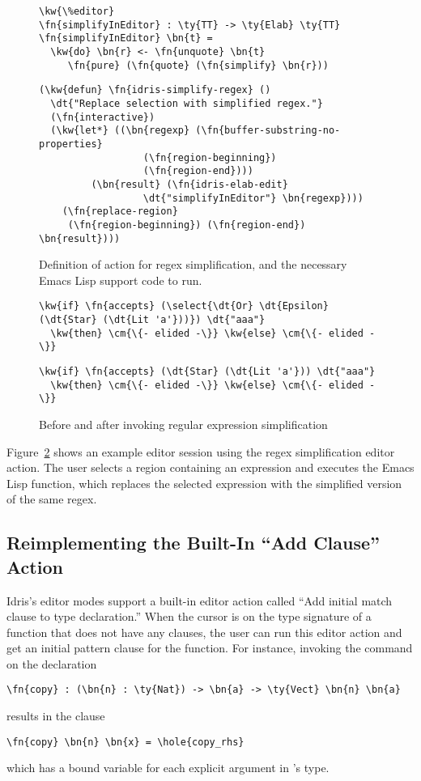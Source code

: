 \begin{figure}[H]
\begin{Verbatim}
\kw{\%editor}
\fn{simplifyInEditor} : \ty{TT} -> \ty{Elab} \ty{TT}
\fn{simplifyInEditor} \bn{t} =
  \kw{do} \bn{r} <- \fn{unquote} \bn{t}
     \fn{pure} (\fn{quote} (\fn{simplify} \bn{r}))
\end{Verbatim}
\hrulefill
\begin{Verbatim}
(\kw{defun} \fn{idris-simplify-regex} ()
  \dt{"Replace selection with simplified regex."}
  (\fn{interactive})
  (\kw{let*} ((\bn{regexp} (\fn{buffer-substring-no-properties}
                  (\fn{region-beginning})
                  (\fn{region-end})))
         (\bn{result} (\fn{idris-elab-edit}
                  \dt{"simplifyInEditor"} \bn{regexp})))
    (\fn{replace-region}
     (\fn{region-beginning}) (\fn{region-end}) \bn{result})))
\end{Verbatim}
\caption{Definition of \Elab{} action for regex simplification, and the
  necessary Emacs Lisp support code to run.}
\label{code:regexElab}
\end{figure}


\begin{figure}[ht]
\begin{Verbatim}
\kw{if} \fn{accepts} (\select{\dt{Or} \dt{Epsilon} (\dt{Star} (\dt{Lit 'a'}))}) \dt{"aaa"}
  \kw{then} \cm{\{- elided -\}} \kw{else} \cm{\{- elided -\}}
\end{Verbatim}
  \vspace{1em}
\begin{Verbatim}
\kw{if} \fn{accepts} (\dt{Star} (\dt{Lit 'a'})) \dt{"aaa"}
  \kw{then} \cm{\{- elided -\}} \kw{else} \cm{\{- elided -\}}
\end{Verbatim}
\caption{Before and after invoking regular expression simplification}
  \label{fig:regex-example}
\end{figure}

Figure~\ref{fig:regex-example} shows an example editor session using the regex
simplification editor action. The user selects a region containing an
expression and executes the Emacs Lisp function, which replaces the selected
expression with the simplified version of the same regex.

\subsection{Reimplementing the Built-In ``Add Clause'' Action}\label{sec:addClause}

Idris's editor modes support a built-in editor action called ``Add initial match
clause to type declaration.'' When the cursor is on the type signature of a
function that does not have any clauses, the user can run this editor action
and get an initial pattern clause for the function.
For instance, invoking the command on the declaration
\begin{Verbatim}
\fn{copy} : (\bn{n} : \ty{Nat}) -> \bn{a} -> \ty{Vect} \bn{n} \bn{a}
\end{Verbatim}
results in the clause
\begin{Verbatim}
\fn{copy} \bn{n} \bn{x} = \hole{copy_rhs}
\end{Verbatim}
which has a bound variable for each explicit argument in 's type.

